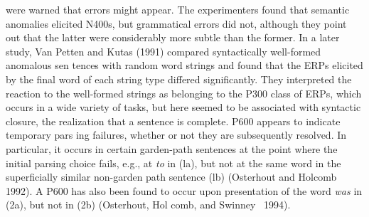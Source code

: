 \clearpage\setcounter{page}{1}\begin{styleStandard}
were warned that errors might appear. The experimenters found that semantic anomalies elicited N400s, but grammatical errors did not, although they point out that the latter were considerably more subtle than the former. In a later study, Van Petten and Kutas (1991) compared syntactically well-formed anomalous sen\- tences with random word strings and found that the ERPs elicited by the final word of each string type differed significantly. They interpreted the reaction to the well-formed strings as belonging to the P300 class of ERPs, which occurs in a wide variety of tasks, but here seemed to be associated with syntactic closure, the realization that a sentence is complete. P600 appears to indicate temporary pars\- ing failures, whether or not they are subsequently resolved. In particular, it occurs in certain garden-path sentences at the point where the initial parsing choice fails, e.g., at \textit{to}\textit{ }in (la), but not at the same word in the superficially similar non-garden\- path sentence (lb) (Osterhout and Holcomb 1992). A P600 has also been found to occur upon presentation of the word \textit{was}\textit{ }in (2a), but not in (2b) (Osterhout, Hol\- comb, and Swinney \ 1994).
\end{styleStandard}


